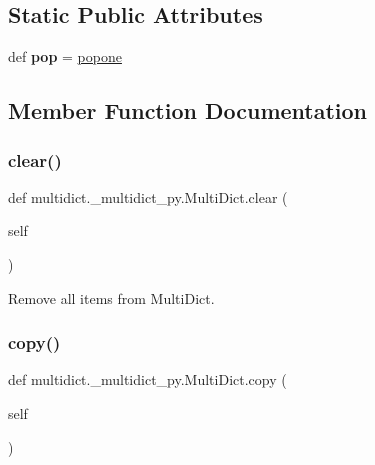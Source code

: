 \subsection*{Static Public Attributes}
\begin{DoxyCompactItemize}
\item 
\mbox{\label{classmultidict_1_1__multidict__py_1_1_multi_dict_aa35e2fd4e41a64c7cef6d1756141639d}} 
def {\bfseries pop} = \hyperlink{classmultidict_1_1__multidict__py_1_1_multi_dict_a9134070c0c471813d71190fbf813b03a}{popone}
\end{DoxyCompactItemize}


\subsection{Member Function Documentation}
\mbox{\label{classmultidict_1_1__multidict__py_1_1_multi_dict_a4507415b8e3ab9113c4580c5ceb24e0e}} 
\subsubsection{\texorpdfstring{clear()}{clear()}}
{\footnotesize\ttfamily def multidict.\+\_\+multidict\+\_\+py.\+Multi\+Dict.\+clear (\begin{DoxyParamCaption}\item[{}]{self }\end{DoxyParamCaption})}

\begin{DoxyVerb}Remove all items from MultiDict.\end{DoxyVerb}
 \mbox{\label{classmultidict_1_1__multidict__py_1_1_multi_dict_ab8f33fbf6098ef289b6ea071ef655835}} 
\subsubsection{\texorpdfstring{copy()}{copy()}}
{\footnotesize\ttfamily def multidict.\+\_\+multidict\+\_\+py.\+Multi\+Dict.\+copy (\begin{DoxyParamCaption}\item[{}]{self }\end{DoxyParamCaption})}

